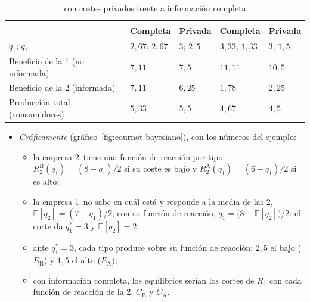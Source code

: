 \documentclass[11pt]{article}
\begin{document}
\begin{table}[H]
\centering
\caption{ con costes privados frente a información completa}\label{tab:cournot-bayesiano}
\begin{tabular}{>{\raggedright\arraybackslash}m{3.8cm}>{\centering\arraybackslash}m{2.4cm}>{\centering\arraybackslash}m{2.4cm}>{\centering\arraybackslash}m{2.4cm}>{\centering\arraybackslash}m{2.4cm}}
\toprule
\rowcolor{tceeazulpalido} & \multicolumn{2}{c}{\textbf{Coste bajo de la 2}} & \multicolumn{2}{c}{\textbf{Coste alto de la 2}}\\
\rowcolor{tceeazulpalido} & \textbf{Completa} & \textbf{Privada} & \textbf{Completa} & \textbf{Privada}\\
\midrule
$q_1$; $q_2$ & $2{,}67$; $2{,}67$ & $3$; $2{,}5$ & $3{,}33$; $1{,}33$ & $3$; $1{,}5$\\
\addlinespace[0.3em]
Beneficio de la 1 (no informada) & $7{,}11$ & \textcolor{tceeverde}{$7{,}5$} & $11{,}11$ & \textcolor{tceerojo}{$10{,}5$}\\
\addlinespace[0.3em]
Beneficio de la 2 (informada) & $7{,}11$ & \textcolor{tceerojo}{$6{,}25$} & $1{,}78$ & \textcolor{tceeverde}{$2{,}25$}\\
\addlinespace[0.3em]
Producción total (consumidores) & $5{,}33$ & \textcolor{tceeverde}{$5{,}5$} & $4{,}67$ & \textcolor{tceerojo}{$4{,}5$}\\
\bottomrule
\end{tabular}
\end{table}

\begin{itemize}
\item \emph{Gráficamente} (gráfico~\ref{fig:cournot-bayesiano}), con los números del ejemplo:
  \begin{itemize}
  \item la empresa 2~tiene una función de reacción por tipo: $R_2^{\mathrm B}(q_1)=(8-q_1)/2$ si su coste es bajo y $R_2^{\mathrm A}(q_1)=(6-q_1)/2$ si es alto;
  \item la empresa 1~no sabe en cuál está y responde a la media de las 2, $\mathbb{E}[q_2]=(7-q_1)/2$, con su función de reacción, $q_1=\big(8-\mathbb{E}[q_2]\big)/2$: el corte da $q_1^*=3$ y $\mathbb{E}[q_2]=2$;
  \item ante $q_1^*=3$, cada tipo produce sobre su función de reacción: $2{,}5$ el bajo ($E_{\mathrm B}$) y $1{,}5$ el alto ($E_{\mathrm A}$);
  \item con información completa, los equilibrios serían los cortes de $R_1$ con cada función de reacción de la 2, $C_{\mathrm B}$ y $C_{\mathrm A}$.
  \end{itemize}
\end{itemize}
\end{document}
